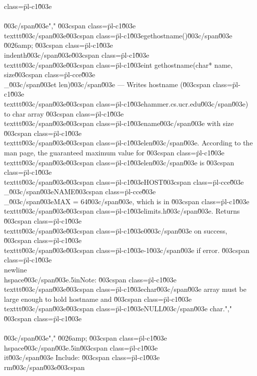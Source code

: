 class=\"pl-c1\"\u003e\\\\\u003c/span\u003e","    \u003cspan class=\"pl-c1\"\u003e\\texttt\u003c/span\u003e{\u003cspan class=\"pl-c1\"\u003egethostname()\u003c/span\u003e} \u0026amp; \u003cspan class=\"pl-c1\"\u003e\\indenth\u003c/span\u003e\u003cspan class=\"pl-c1\"\u003e\\texttt\u003c/span\u003e{\u003cspan class=\"pl-c1\"\u003eint gethostname(char* name, size\u003cspan class=\"pl-cce\"\u003e\\_\u003c/span\u003et len)\u003c/span\u003e} --- Writes hostname (\u003cspan class=\"pl-c1\"\u003e\\texttt\u003c/span\u003e{\u003cspan class=\"pl-c1\"\u003ehammer.cs.ucr.edu\u003c/span\u003e}) to char array \u003cspan class=\"pl-c1\"\u003e\\texttt\u003c/span\u003e{\u003cspan class=\"pl-c1\"\u003ename\u003c/span\u003e} with size \u003cspan class=\"pl-c1\"\u003e\\texttt\u003c/span\u003e{\u003cspan class=\"pl-c1\"\u003elen\u003c/span\u003e}.  According to the man page, the guaranteed maximum value for \u003cspan class=\"pl-c1\"\u003e\\texttt\u003c/span\u003e{\u003cspan class=\"pl-c1\"\u003elen\u003c/span\u003e} is \u003cspan class=\"pl-c1\"\u003e\\texttt\u003c/span\u003e{\u003cspan class=\"pl-c1\"\u003eHOST\u003cspan class=\"pl-cce\"\u003e\\_\u003c/span\u003eNAME\u003cspan class=\"pl-cce\"\u003e\\_\u003c/span\u003eMAX = 64\u003c/span\u003e}, which is in \u003cspan class=\"pl-c1\"\u003e\\texttt\u003c/span\u003e{\u003cspan class=\"pl-c1\"\u003elimits.h\u003c/span\u003e}. Returns \u003cspan class=\"pl-c1\"\u003e\\texttt\u003c/span\u003e{\u003cspan class=\"pl-c1\"\u003e0\u003c/span\u003e} on success, \u003cspan class=\"pl-c1\"\u003e\\texttt\u003c/span\u003e{\u003cspan class=\"pl-c1\"\u003e-1\u003c/span\u003e} if error. \u003cspan class=\"pl-c1\"\u003e\\newline\\hspace\u003c/span\u003e{.5in}Note: \u003cspan class=\"pl-c1\"\u003e\\texttt\u003c/span\u003e{\u003cspan class=\"pl-c1\"\u003echar\u003c/span\u003e} array must be large enough to hold hostname and \u003cspan class=\"pl-c1\"\u003e\\texttt\u003c/span\u003e{\u003cspan class=\"pl-c1\"\u003eNULL\u003c/span\u003e} char.","        \u003cspan class=\"pl-c1\"\u003e\\\\\u003c/span\u003e","    \u0026amp; \u003cspan class=\"pl-c1\"\u003e\\hspace\u003c/span\u003e{.5in}\u003cspan class=\"pl-c1\"\u003e\\it\u003c/span\u003e Include: \u003cspan class=\"pl-c1\"\u003e\\rm\u003c/span\u003e\u003cspan 
